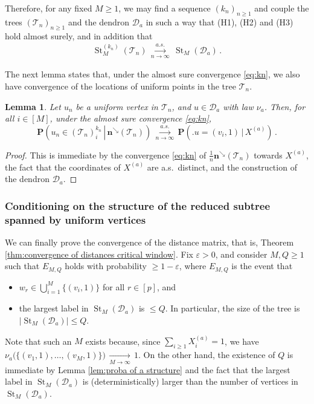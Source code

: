 \documentclass{article}
\newtheorem{lemma}[theorem]{Lemma}
\theoremstyle{remark}
\newcommand{\cv}[1]{\,\underset{#1}{\longrightarrow}\,}
\newcommand{\abs}[1]{{\left|#1\right|}}
\newcommand{\cT}{\mathcal{T}}
\newcommand{\cD}{\mathcal{D}}
\newcommand{\bn}{\mathbf{n}}
\newcommand{\probcond}[2]{\mathbf{P}{\left(\left. #1 \,\right|\, #2 \right)}}
\DeclareMathOperator{\St}{St}
\begin{document}
Therefore, for any fixed $M \geq 1$, we may find a sequence $(k_n)_{n \geq 1}$ and couple the trees $(\cT_n)_{n \geq 1}$ and the dendron $\cD_a$ in such a way that (H1), (H2) and (H3) hold almost surely, and in addition that 
\begin{align*}
\St_M^{(k_n)}(\cT_n) \overset{a.s.}{\cv{n\to\infty}} \St_M(\cD_a) \,.
\end{align*}

The next lemma states that, under the almost sure convergence \eqref{eq:kn}, we also have convergence of the locations of uniform points in the tree $\cT_n$.

\begin{lemma}
\label{lem:same component}
Let $u_n$ be a uniform vertex in $\cT_n$, and $u \in \cD_a$ with law $\nu_a$. 
Then, for all $i \in [M]$, under the almost sure convergence \eqref{eq:kn},
\[
    \probcond{u_n \in (\cT_n)_i^{k_n}}{\bn^\searrow(\cT_n)} 
    \overset{a.s.}{\cv{n\to\infty}} 
    \probcond{\big. u=(v_{i},1)}{X^{(a)}} \,.
\]
\end{lemma}

\begin{proof}
This is immediate by the convergence \eqref{eq:kn} of $\frac1n \bn^\searrow(\cT_n)$ towards $X^{(a)}$, the fact that the coordinates of $X^{(a)}$ are a.s.\ distinct, and the construction of the dendron $\cD_a$.
\end{proof}


\subsubsection{Conditioning on the structure of the reduced subtree spanned by uniform vertices}
\label{sssec:final proof}

We can finally prove the convergence of the distance matrix, that is, Theorem \ref{thm:convergence of distances critical window}. 
Fix $\varepsilon>0$, and consider $M,Q \geq 1$ such that $E_{M,Q}$ holds with probability $\geq 1-\varepsilon$, where $E_{M,Q}$ is the event that
\begin{itemize}
    \item $w_r \in \bigcup\limits_{i=1}^M \{(v_i,1)\}$ for all $r \in [p]$, and
    \item the largest label in $\St_M(\cD_a)$ is $\leq Q$.
    In particular, the size of the tree is $\abs{ \St_M(\cD_a) } \leq Q$.
\end{itemize}
Note that such an $M$ exists because, since $\sum_{i \geq 1} X^{(a)}_i =1$, we have $\nu_a\big( \{(v_1,1),\ldots,(v_M,1)\} \big) \cv{M\to\infty} 1$. 
On the other hand, the existence of $Q$ is immediate by Lemma \ref{lem:proba of a structure} and the fact that the largest label in $\St_M(\cD_a)$ is (deterministically) larger than the number of vertices in $\St_M(\cD_a)$.
\end{document}
